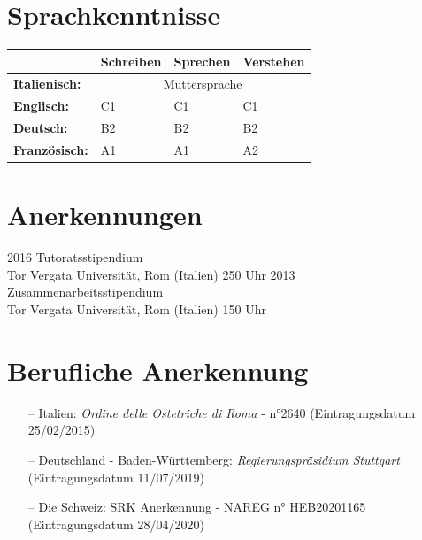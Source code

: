 \documentclass[11pt]{friggeri-cv}
\begin{document}
\newpage
\section{Sprachkenntnisse}
\begin{table}[!h]
  \centering
  \renewcommand{\arraystretch}{1.45}
  \begin{tabular}{ p{3cm} p{3cm} p{3cm} p{3cm} }
    \hline
    & \textbf{Schreiben}       & \textbf{Sprechen} & \textbf{Verstehen}  \\     \hline
    \textbf{Italienisch:}      & \multicolumn{3}{c}{Muttersprache}       \\
    \textbf{Englisch:}         & C1 & C1 & C1                            \\ 
    \textbf{Deutsch:}          & B2 & B2 & B2                            \\ 
    \textbf{Franz\"{o}sisch:}  & A1 & A1 & A2                            \\    \hline
  \end{tabular}
\end{table}

\section{Anerkennungen}
\begin{entrylist}
  \entry
    {2016}
    {Tutoratsstipendium}
    {\\Tor Vergata Universit\"{a}t, Rom (Italien)}
    {250 Uhr}
  \entry
    {2013}
    {Zusammenarbeitsstipendium}
    {\\Tor Vergata Universit\"{a}t, Rom (Italien)}
    {150 Uhr}
\end{entrylist}

\vspace{-10pt}
\section{Berufliche Anerkennung}
\begin{itemize}
  \item[--] Italien: \emph{Ordine delle Ostetriche di Roma} - n°2640 (Eintragungsdatum 25/02/2015)
  \item[--] Deutschland - Baden-W\"{u}rttemberg: \emph{Regierungspr\"{a}sidium Stuttgart} (Eintragungsdatum 11/07/2019)
  \item[--] Die Schweiz: SRK Anerkennung - NAREG n° HEB20201165 (Eintragungsdatum 28/04/2020)
\end{itemize}
\end{document}
